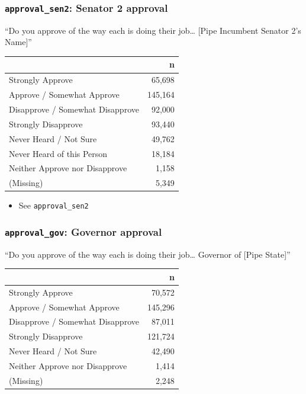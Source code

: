 \documentclass[10pt,article,oneside]{memoir}
\theoremstyle{definition}
\begin{document}
\hypertarget{approval_sen2-senator-2-approval}{%
\subsubsection{\texorpdfstring{\texttt{approval\_sen2}: Senator 2
approval}{approval\_sen2: Senator 2 approval}}\label{approval_sen2-senator-2-approval}}

``Do you approve of the way each is doing their job\ldots{} {[}Pipe
Incumbent Senator 2's Name{]}''

\begin{table}[H]
\centering
\begin{tabular}{lr}
\toprule
 & n\\
\midrule
Strongly Approve & 65,698\\
Approve / Somewhat Approve & 145,164\\
Disapprove / Somewhat Disapprove & 92,000\\
Strongly Disapprove & 93,440\\
Never Heard / Not Sure & 49,762\\
Never Heard of this Person & 18,184\\
Neither Approve nor Disapprove & 1,158\\
(Missing) & 5,349\\
\bottomrule
\end{tabular}
\end{table}

\begin{itemize}
\tightlist
\item
  See \texttt{approval\_sen2}
\end{itemize}

\hypertarget{approval_gov-governor-approval}{%
\subsubsection{\texorpdfstring{\texttt{approval\_gov}: Governor
approval}{approval\_gov: Governor approval}}\label{approval_gov-governor-approval}}

``Do you approve of the way each is doing their job\ldots{} Governor of
{[}Pipe State{]}''

\begin{table}[H]
\centering
\begin{tabular}{lr}
\toprule
 & n\\
\midrule
Strongly Approve & 70,572\\
Approve / Somewhat Approve & 145,296\\
Disapprove / Somewhat Disapprove & 87,011\\
Strongly Disapprove & 121,724\\
Never Heard / Not Sure & 42,490\\
Neither Approve nor Disapprove & 1,414\\
(Missing) & 2,248\\
\bottomrule
\end{tabular}
\end{table}
\end{document}
